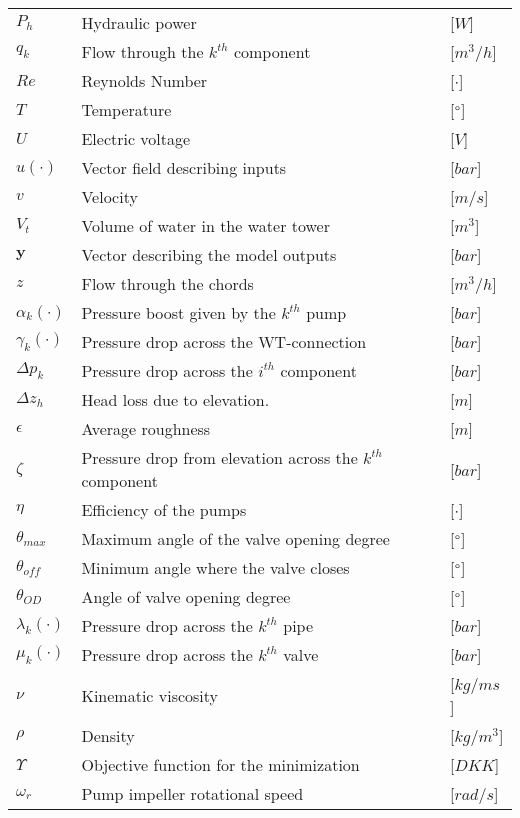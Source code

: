 \begin{adjustbox}{max height=0.49\textheight}
\begin{tabular}{l l l}
	$P_h$				&	Hydraulic power									      		& [$W$]\\
	$q_k$				&	Flow through the $k^{th}$ component 		     			& [$m^3/h$]\\
	$Re$				&	Reynolds Number								     			& [$\cdot$]\\
	$T$					&	Temperature									     			& [$\degree$]\\
	$U$					&	Electric voltage 											& [$V$]\\
	$u(\cdot)$			&	Vector field describing inputs 								& [$bar$]\\
	$v$					&	Velocity									     			& [$m/s$]\\
	$V_t$				&	Volume of water in the water tower							& [$m^3$]\\
	$\bm{y}$			&	Vector describing the model outputs							& [$bar$]\\	
	$z$					&	Flow through the chords										& [$m^3/h$]\\
	$\alpha_k(\cdot)$	&	Pressure boost given by the	$k^{th}$ pump					& [$bar$]\\
	$\gamma_k(\cdot)$	&	Pressure drop across the WT-connection						& [$bar$]\\
	$\Delta p_k$		&	Pressure drop across the $i^{th}$ component      			& [$bar$]\\
	$\Delta z_h$		&	Head loss due to elevation. 						    	& [$m$]\\
	$\epsilon$			&	Average roughness									     	& [$m$]\\
	$\zeta$				&	Pressure drop from elevation across the $k^{th}$ component	& [$bar$]\\
	$\eta$				&	Efficiency of the pumps								   		& [$\cdot$]\\
	$\theta_{max}$		&	Maximum angle of the valve opening degree					& [$\degree$]\\
	$\theta_{off}$		&	Minimum angle where the valve closes						& [$\degree$]\\
	$\theta_{OD}$		&	Angle of valve opening degree								& [$\degree$]\\
	$\lambda_k(\cdot)$	&	Pressure drop across the $k^{th}$ pipe						& [$bar$]\\
	$\mu_k(\cdot)$		&	Pressure drop across the $k^{th}$ valve						& [$bar$]\\
	$\nu$				&	Kinematic viscosity									     	& [$kg/ms$]\\
	$\rho$				&	Density									     				& [$kg/m^3$]\\
	$\Upsilon$			&	Objective function for the minimization 					& [$DKK$]\\
	$\omega_r$			&	Pump impeller rotational speed									& [$rad/s$]\\	
\end{tabular}
\end{adjustbox}

